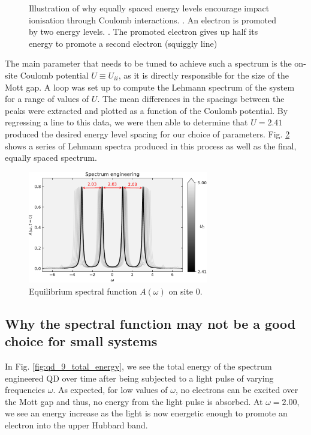 \begin{figure}[!hbt]
    \captionsetup{singlelinecheck=off}
    \caption{Illustration of why equally spaced energy levels encourage impact ionisation through Coulomb interactions.
    . An electron is promoted by two energy levels. 
    . The promoted electron gives up half its energy to promote a second electron (squiggly line)}
    \label{fig:qd_spectrum_delta}
\end{figure}

The main parameter that needs to be tuned to achieve such a spectrum is the on-site Coulomb potential $U \equiv U_{ii}$, as it is directly responsible for the size of the Mott gap. A loop was set up to compute the Lehmann spectrum of the system for a range of values of $U$. The mean differences in the spacings between the peaks were extracted and plotted as a function of the Coulomb potential. By regressing a line to this data, we were then able to determine that $U = 2.41$ produced the desired energy level spacing for our choice of parameters. Fig. \ref{fig:spectrum_engineering} shows a series of Lehmann spectra produced in this process as well as the final, equally spaced spectrum.


\begin{figure}[!hbt]
    \centering
    \includegraphics[width=0.7\textwidth]{graph/spectrum_engineering.pdf}
    \caption{Equilibrium spectral function $A(\omega)$ on site 0.}
    \label{fig:spectrum_engineering}
\end{figure}

\subsection{Why the spectral function may not be a good choice for small systems}
In Fig. \ref{fig:qd_9_total_energy}, we see the total energy of the spectrum engineered QD over time after being subjected to a light pulse of varying frequencies $\omega$. As expected, for low values of $\omega$, no electrons can be excited over the Mott gap and thus, no energy from the light pulse is absorbed. At $\omega = 2.00$, we see an energy increase as the light is now energetic enough to promote an electron into the upper Hubbard band.

